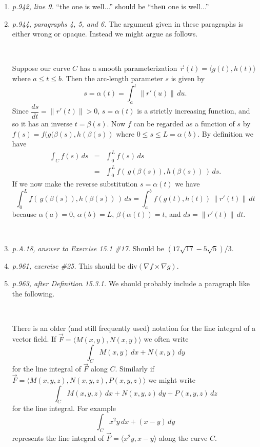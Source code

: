 \documentclass[12 pt]{amsart}
\begin{document}
\begin{enumerate}
    \item  \emph{p.942, line 9.}  ``the one is well...'' should be ``the\textbf{n} one is well...''  \\
    
    \item  \emph{p.944, paragraphs 4, 5, and 6.}  The argument given in these paragraphs is either wrong or opaque.  Instead we might argue as follows.
    
    \ 
    
    Suppose our curve $C$ has a smooth parameterization $\vec{r}(t) = \langle g(t), h(t) \rangle$ where $a \leq t \leq b$.  Then the arc-length parameter $s$ is given by
    \[
    s = \alpha(t) = \int_a^t \| r'(u) \|\,du.
    \]
    Since $\dfrac{ds}{dt} = \| r'(t) \| > 0$, $s = \alpha(t)$ is a strictly increasing function, and so it has an inverse $t = \beta(s)$.  Now $f$ can be regarded as a function of $s$ by $f(s) = f(g(\beta(s), h(\beta(s))$ where $0 \leq s \leq L = \alpha(b)$.  By definition we have
    \begin{eqnarray*}
    \int_C f(s)\, ds & = & \int_0^L f(s)\, ds  \\
     & = & \int_0^L f(\,g(\beta(s)), h(\beta(s))\,)\, ds.
    \end{eqnarray*}
    If we now make the reverse substitution $s = \alpha(t)$ we have 
    \[
    \int_0^L f(\,g(\beta(s)), h(\beta(s))\,)\, ds 
     = \int_a^b f(g(t), h(t))\,\|r'(t)\|\,dt
    \]
    because $\alpha(a) = 0$, $\alpha(b) = L$, $\beta(\alpha(t)) = t$, and $ds = \| r'(t) \| \, dt$.
    
    \ \\
    
    \item  \emph{p.A.18, answer to Exercise 15.1 \#17.}  Should be $(17\sqrt{17} - 5\sqrt{5})/3$.  \\
    
    \item  \emph{p.961, exercise \#25.}  This should be $\text{div} (\nabla f \times \nabla g)$.  \\
    
    \item  \emph{p.963, after Definition 15.3.1.} We should probably include a paragraph like the following. 
    
    \ 
    
    There is an older (and still frequently used) notation for the line integral of a vector field.  If $\vec{F} = \langle M(x, y), N(x, y) \rangle$ we often write
    \[
    \int_C M(x,y)\,dx + N(x,y)\,dy
    \]
    for the line integral of $\vec{F}$ along $C$.  Similarly if $\vec{F} = \langle M(x,y,z), N(x,y,z), P(x,y,z) \rangle$ we might write
    \[
    \int_C M(x,y,z)\,dx + N(x,y,z)\,dy + P(x,y,z)\,dz
    \]
    for the line integral.  For example
    \[
    \int_C x^2y\,dx + (x - y)\,dy
    \]
    represents the line integral of $\vec{F} = \langle x^2y, x-y \rangle$ along the curve $C$.  \\
    

\end{enumerate}
\end{document}
